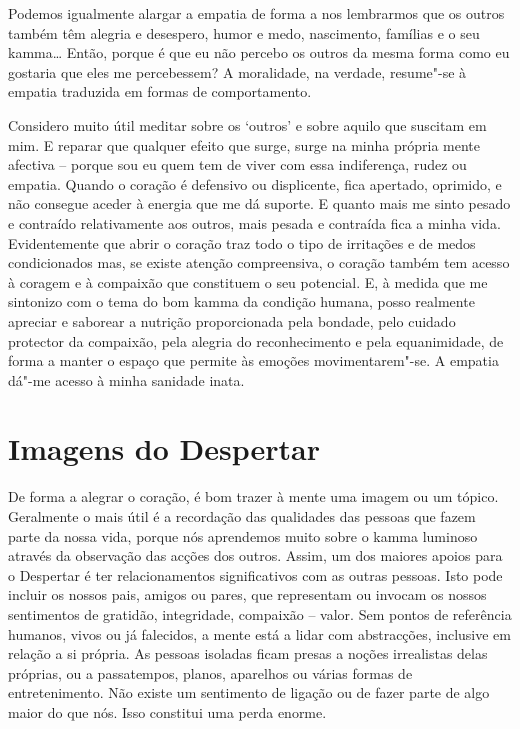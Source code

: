 Podemos igualmente alargar a empatia de forma a nos lembrarmos que os outros
também têm alegria e desespero, humor e medo, nascimento, famílias e o seu
kamma\ldots{} Então, porque é que eu não percebo os outros da mesma forma como
eu gostaria que eles me percebessem? A moralidade, na verdade, resume"-se à
empatia traduzida em formas de comportamento.

Considero muito útil meditar sobre os `outros' e sobre aquilo que suscitam em
mim. E reparar que qualquer efeito que surge, surge na minha própria mente
afectiva -- porque sou eu quem tem de viver com essa indiferença, rudez ou
empatia. Quando o coração é defensivo ou displicente, fica apertado, oprimido, e
não consegue aceder à energia que me dá suporte. E quanto mais me sinto pesado e
contraído relativamente aos outros, mais pesada e contraída fica a minha vida.
Evidentemente que abrir o coração traz todo o tipo de irritações e de medos
condicionados mas, se existe atenção compreensiva, o coração também tem acesso à
coragem e à compaixão que constituem o seu potencial. E, à medida que me
sintonizo com o tema do bom kamma da condição humana, posso realmente apreciar e
saborear a nutrição proporcionada pela bondade, pelo cuidado protector da
compaixão, pela alegria do reconhecimento e pela equanimidade, de forma a manter
o espaço que permite às emoções movimentarem"-se. A empatia dá"-me acesso à minha
sanidade inata.

\section{Imagens do Despertar}

De forma a alegrar o coração, é bom trazer à mente uma imagem ou um tópico.
Geralmente o mais útil é a recordação das qualidades das pessoas que fazem parte
da nossa vida, porque nós aprendemos muito sobre o kamma luminoso através da
observação das acções dos outros. Assim, um dos maiores apoios para o Despertar
é ter relacionamentos significativos com as outras pessoas. Isto pode incluir os
nossos pais, amigos ou pares, que representam ou invocam os nossos sentimentos
de gratidão, integridade, compaixão -- valor. Sem pontos de referência humanos,
vivos ou já falecidos, a mente está a lidar com abstracções, inclusive em
relação a si própria. As pessoas isoladas ficam presas a noções irrealistas
delas próprias, ou a passatempos, planos, aparelhos ou várias formas de
entretenimento. Não existe um sentimento de ligação ou de fazer parte de algo
maior do que nós. Isso constitui uma perda enorme.

